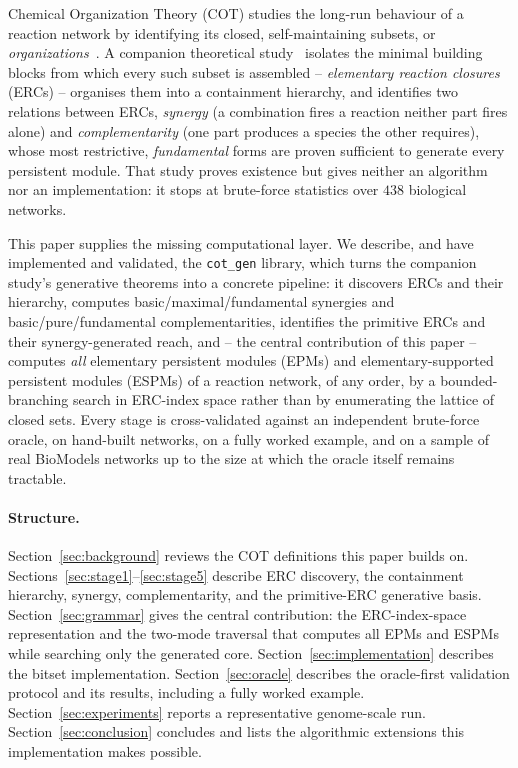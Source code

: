 \documentclass[11pt]{article}
\theoremstyle{plain}
\theoremstyle{remark}
\begin{document}
Chemical Organization Theory (COT) studies the long-run behaviour of a
reaction network by identifying its closed, self-maintaining subsets, or
\emph{organizations}~\cite{dittrich2007chemical}. A companion theoretical
study~\cite{BMBcompanion} isolates the minimal building blocks from which
every such subset is assembled -- \emph{elementary reaction closures}
(ERCs) -- organises them into a containment hierarchy, and identifies two
relations between ERCs, \emph{synergy} (a combination fires a reaction
neither part fires alone) and \emph{complementarity} (one part produces a
species the other requires), whose most restrictive, \emph{fundamental}
forms are proven sufficient to generate every persistent module. That
study proves existence but gives neither an algorithm nor an
implementation: it stops at brute-force statistics over $438$ biological
networks.

This paper supplies the missing computational layer. We describe, and have
implemented and validated, the \texttt{cot\_gen} library, which turns the
companion study's generative theorems into a concrete pipeline: it
discovers ERCs and their hierarchy, computes basic/maximal/fundamental
synergies and basic/pure/fundamental complementarities, identifies the
primitive ERCs and their synergy-generated reach, and -- the central
contribution of this paper -- computes \emph{all} elementary persistent
modules (EPMs) and elementary-supported persistent modules (ESPMs) of a
reaction network, of any order, by a bounded-branching search in ERC-index
space rather than by enumerating the lattice of closed sets. Every stage
is cross-validated against an independent brute-force oracle, on
hand-built networks, on a fully worked example, and on a sample of real
BioModels networks up to the size at which the oracle itself remains
tractable.

\paragraph{Structure.} Section~\ref{sec:background} reviews the COT
definitions this paper builds on. Sections~\ref{sec:stage1}--\ref{sec:stage5}
describe ERC discovery, the containment hierarchy, synergy, complementarity,
and the primitive-ERC generative basis. Section~\ref{sec:grammar} gives the
central contribution: the ERC-index-space representation and the two-mode
traversal that computes all EPMs and ESPMs while searching only the
generated core. Section~\ref{sec:implementation} describes the bitset
implementation. Section~\ref{sec:oracle} describes the oracle-first
validation protocol and its results, including a fully worked example.
Section~\ref{sec:experiments} reports a representative genome-scale run.
Section~\ref{sec:conclusion} concludes and lists the algorithmic
extensions this implementation makes possible.
\end{document}
